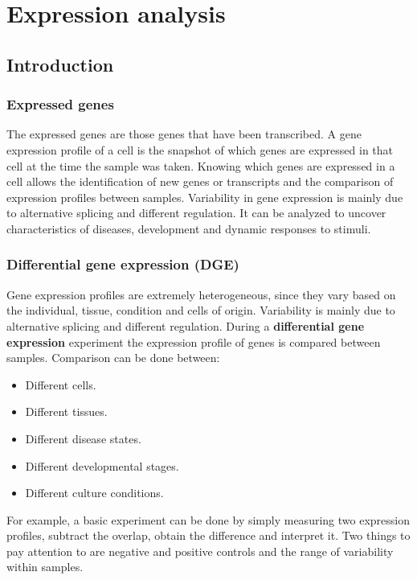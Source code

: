 \graphicspath{{chapters/05/images}}
\chapter{Expression analysis}

\section{Introduction}

	\subsection{Expressed genes}
	The expressed genes are those genes that have been transcribed.
	A gene expression profile of a cell is the snapshot of which genes are expressed in that cell at the time the sample was taken.
	Knowing which genes are expressed in a cell allows the identification of new genes or transcripts and the comparison of expression profiles between samples.
	Variability in gene expression is mainly due to alternative splicing and different regulation.
	It can be analyzed to uncover characteristics of diseases, development and dynamic responses to stimuli.

	\subsection{Differential gene expression (DGE)}
	Gene expression profiles are extremely heterogeneous, since they vary based on the individual, tissue, condition and cells of origin.
	Variability is mainly due to alternative splicing and different regulation.
	During a \textbf{differential gene expression} experiment the expression profile of genes is compared between samples.
	Comparison can be done between:

	\begin{multicols}{2}
		\begin{itemize}
			\item Different cells.
			\item Different tissues.
			\item Different disease states.
			\item Different developmental stages.
			\item Different culture conditions.
		\end{itemize}
	\end{multicols}
	For example, a basic experiment can be done by simply measuring two expression profiles, subtract the overlap, obtain the difference and interpret it.
	Two things to pay attention to are negative and positive controls and the range of variability within samples. 

